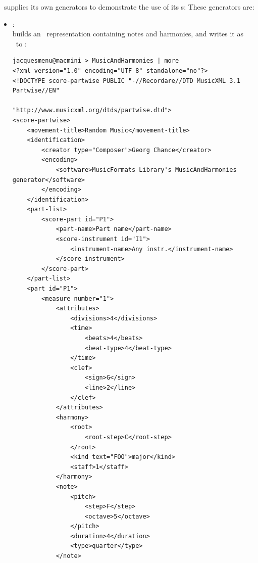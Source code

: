 \mf\ supplies its own generators to demonstrate the use of its \API s:
%
These generators are:
\begin{itemize}
\item {}: \\
builds an \mxsrRepr\ representation containing notes and harmonies, and writes it as \mxml\ to \standardOutput:
\begin{lstlisting}[language=MusicXML]
jacquesmenu@macmini > MusicAndHarmonies | more
<?xml version="1.0" encoding="UTF-8" standalone="no"?>
<!DOCTYPE score-partwise PUBLIC "-//Recordare//DTD MusicXML 3.1 Partwise//EN"
                        "http://www.musicxml.org/dtds/partwise.dtd">
<score-partwise>
    <movement-title>Random Music</movement-title>
    <identification>
        <creator type="Composer">Georg Chance</creator>
        <encoding>
            <software>MusicFormats Library's MusicAndHarmonies generator</software>
        </encoding>
    </identification>
    <part-list>
        <score-part id="P1">
            <part-name>Part name</part-name>
            <score-instrument id="I1">
                <instrument-name>Any instr.</instrument-name>
            </score-instrument>
        </score-part>
    </part-list>
    <part id="P1">
        <measure number="1">
            <attributes>
                <divisions>4</divisions>
                <time>
                    <beats>4</beats>
                    <beat-type>4</beat-type>
                </time>
                <clef>
                    <sign>G</sign>
                    <line>2</line>
                </clef>
            </attributes>
            <harmony>
                <root>
                    <root-step>C</root-step>
                </root>
                <kind text="FOO">major</kind>
                <staff>1</staff>
            </harmony>
            <note>
                <pitch>
                    <step>F</step>
                    <octave>5</octave>
                </pitch>
                <duration>4</duration>
                <type>quarter</type>
            </note>


\end{lstlisting}
\end{itemize}
